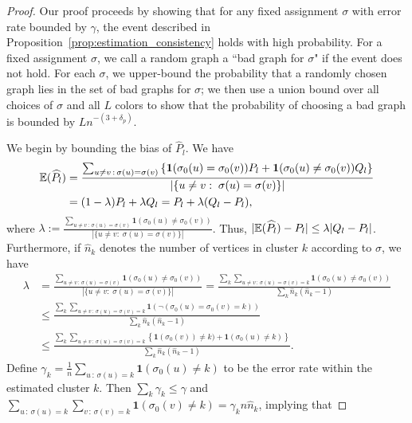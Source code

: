 \documentclass{article}
\begin{document}
\begin{proof}
Our proof proceeds by showing that for any fixed assignment $\sigma$ with error rate bounded by $\gamma$, the event described in Proposition~\ref{prop:estimation_consistency} holds with high probability. For a fixed assignment $\sigma$, we call a random graph a ``bad graph for $\sigma$" if the event does not hold. For each $\sigma$, we upper-bound the probability that a randomly chosen graph lies in the set of bad graphs for $\sigma$; we then use a union bound over all choices of $\sigma$ and all $L$ colors to show that the probability of choosing a bad graph is bounded by $Ln^{-(3+\delta_p)}$.

We begin by bounding the bias of $\hat{P}_l$. We have
\begin{align}
{\mathbb E}(\widehat{P_l}) &= 
   \frac{\sum_{u \neq v \,:\, \sigma(u) = \sigma(v)} \left\{
             \mbox{\boldmath $1$}(\sigma_0(u) = \sigma_0(v) ) P_l + 
               \mbox{\boldmath $1$}(\sigma_0(u) \neq \sigma_0(v)) Q_l\right\}}{|\{u \neq v: \; \sigma(u) = \sigma(v)\}|} \nonumber \\
  &= (1 - \lambda) P_l + \lambda Q_l  = P_l + \lambda (Q_l - P_l),
  \label{eqn:bias_simple_bound}
\end{align}
where $\lambda := \frac{\sum_{u \neq v \,:\, \sigma(u) = \sigma(v)} 
     \mathbf{1}(\sigma_0(u) \neq \sigma_0(v)) }{|\{u \neq v: \; \sigma(u) = \sigma(v)\}|}$. Thus, $|{\mathbb E}(\widehat{P}_l) - P_l | \leq \lambda |Q_l - P_l|$. Furthermore, if $\hat{n}_k$ denotes the number of vertices in cluster $k$ according to $\sigma$, we have
\begin{align*}
\lambda 
  &= \frac{\sum_{u \neq v \,:\, \sigma(u) = \sigma(v) }\mathbf{1}(\sigma_0(u) \neq \sigma_0(v)) }{|\{u \neq v: \; \sigma(u) = \sigma(v)\}|} = 
   \frac{\sum_k \sum_{u \neq v \,:\, \sigma(u)=\sigma(v)=k} \mathbf{1}(\sigma_0(u) \neq \sigma_0(v))}{\sum_k \hat{n}_k (\hat{n}_k-1)} 
      \\
  &\leq \frac{\sum_k \sum_{u \neq v \,:\, \sigma(u)=\sigma(v)=k} 
       \mathbf{1}( \neg (\sigma_0(u) = \sigma_0(v) =k) )}{\sum_k \hat{n}_k (\hat{n}_k-1)} 
      \\ 
  &\leq \frac{ \sum_k \sum_{u \neq v \,:\, \sigma(u)=\sigma(v)=k} \left\{\mathbf{1}(\sigma_0(v)) \neq k) + \mathbf{1}(\sigma_0(u) \neq k)\right\}}
            {\sum_k \hat{n}_k (\hat{n}_k - 1)}.
\end{align*}
Define $\gamma_k = \frac{1}{n} \sum_{u \,:\, \sigma(u)=k} \mathbf{1}(\sigma_0(u) \neq k)$ to be the error rate within the estimated cluster $k$. Then $\sum_k \gamma_k \le \gamma$ and $\sum_{u \,:\, \sigma(u) = k} \sum_{v \,:\, \sigma(v) = k} \mathbf{1}(\sigma_0(v) \neq k) = \gamma_k n \hat{n}_k$, implying that

\end{proof}
\end{document}

